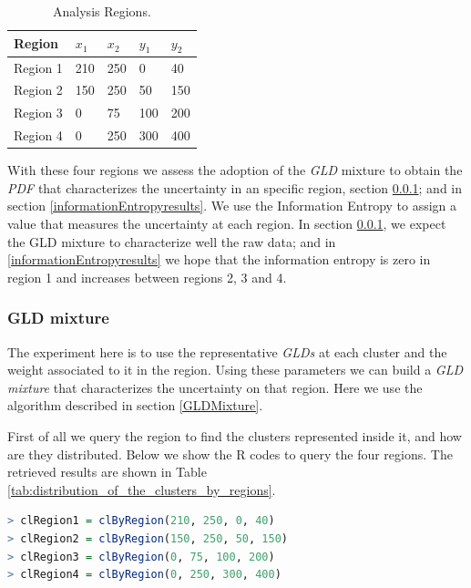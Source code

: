 \begin{table}
\begin{center}
    \begin{tabular}{|l|l|l|l|l|}
    \hline
    \textbf{Region} & $x_{1}$ & $x_{2}$ & $y_{1}$ & $y_{2}$        \\ \hline
    Region 1     & 210 & 250 & 0 & 40              \\ \hline
    Region 2     & 150 & 250 & 50 & 150           \\ \hline
    Region 3     & 0 & 75 & 100 & 200            \\ \hline
    Region 4     & 0 & 250 & 300 & 400               \\ \hline
    \end{tabular}
    \caption {Analysis Regions.}
    \label{tab:analysis_regions}
    \end{center}
\end{table}

With these four regions we assess the adoption of the \textit{GLD} mixture to obtain the \textit{PDF} that characterizes the uncertainty in an specific  region, section \ref{GLDmixtureresults}; and in section \ref{informationEntropyresults}. We use the Information Entropy to assign a value that measures the uncertainty at each region. In section \ref{GLDmixtureresults}, we expect the GLD mixture to characterize well the raw data; and in \ref{informationEntropyresults} we hope that the information entropy is zero in region 1 and increases between regions 2, 3 and 4.

\subsubsection{GLD mixture}\label{GLDmixtureresults}
The experiment here is to use the representative \textit{GLDs} at each cluster and the weight associated to it in the region. Using these parameters we can build a \textit{GLD mixture} that characterizes the uncertainty on that region. Here we use the algorithm described in section \ref{GLDMixture}.

First of all we query the region to find  the clusters represented inside it, and how are they distributed. Below we show the R codes to query the four regions. The retrieved results are shown in Table \ref{tab:distribution_of_the_clusters_by_regions}.

\begin{lstlisting}[language=R]
> clRegion1 = clByRegion(210, 250, 0, 40)
> clRegion2 = clByRegion(150, 250, 50, 150)
> clRegion3 = clByRegion(0, 75, 100, 200)
> clRegion4 = clByRegion(0, 250, 300, 400)
\end{lstlisting}

